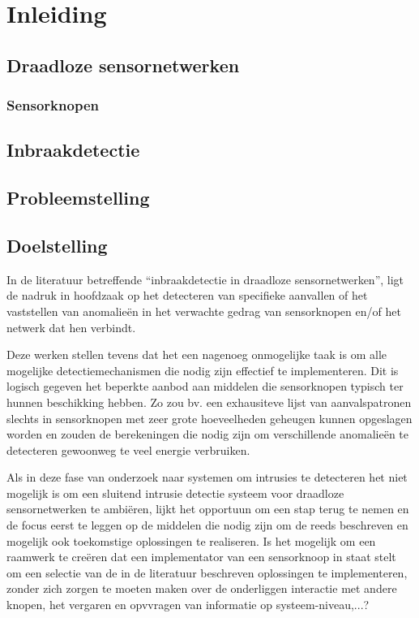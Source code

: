 
\chapter{Inleiding}
\label{inleiding}

\TODO

\section{Draadloze sensornetwerken}

\TODO

\subsection{Sensorknopen}

\TODO

\section{Inbraakdetectie}

\TODO

\section{Probleemstelling}

\TODO

\section{Doelstelling}

In de literatuur betreffende ``inbraakdetectie in draadloze sensornetwerken'',
ligt de nadruk in hoofdzaak op het detecteren van specifieke aanvallen of het
vaststellen van anomalie\"en in het verwachte gedrag van sensorknopen en/of het
netwerk dat hen verbindt.

Deze werken stellen tevens dat het een nagenoeg onmogelijke taak is om alle
mogelijke detectiemechanismen die nodig zijn effectief te implementeren. Dit is
logisch gegeven het beperkte aanbod aan middelen die sensorknopen typisch ter
hunnen beschikking hebben. Zo zou bv. een exhausiteve lijst van aanvalspatronen
slechts in sensorknopen met zeer grote hoeveelheden geheugen kunnen opgeslagen
worden en zouden de berekeningen die nodig zijn om verschillende anomalie\"en
te detecteren gewoonweg te veel energie verbruiken.

Als in deze fase van onderzoek naar systemen om intrusies te detecteren het
niet mogelijk is om een sluitend intrusie detectie systeem voor draadloze
sensornetwerken te ambi\"eren, lijkt het opportuun om een stap terug te nemen en
de focus eerst te leggen op de middelen die nodig zijn om de reeds beschreven
en mogelijk ook toekomstige oplossingen te realiseren. Is het mogelijk om een
raamwerk te cre\"eren dat een implementator van een sensorknoop in staat stelt om
een selectie van de in de literatuur beschreven oplossingen te implementeren,
zonder zich zorgen te moeten maken over de onderliggen interactie met andere
knopen, het vergaren en opvvragen van informatie op systeem-niveau,...?

